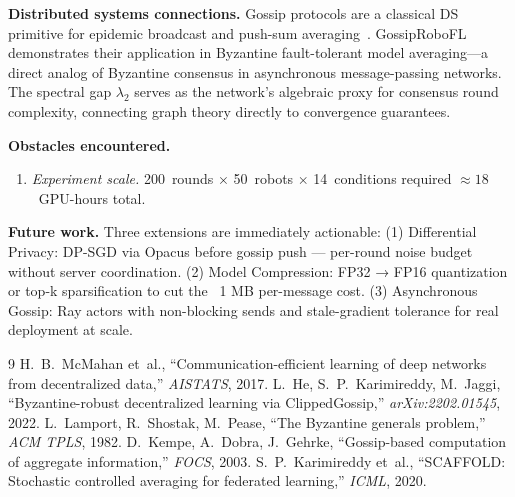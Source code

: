 \documentclass[conference]{IEEEtran}
\newcommand{\sys}{GossipRoboFL\xspace}
\begin{document}
\textbf{Distributed systems connections.}
Gossip protocols are a classical DS primitive for epidemic broadcast and
push-sum averaging~\cite{kempe2003}.
\sys demonstrates their application in Byzantine fault-tolerant model
averaging---a direct analog of Byzantine consensus in asynchronous
message-passing networks.
The spectral gap $\lambda_2$ serves as the network's algebraic proxy for
consensus round complexity, connecting graph theory directly to convergence
guarantees.

\textbf{Obstacles encountered.}
\begin{enumerate}
\item \textit{Experiment scale.}
200~rounds $\times$ 50~robots $\times$ 14~conditions required
${\approx}18$~GPU-hours total.
\end{enumerate}

\textbf{Future work.}
Three extensions are immediately actionable:
(1) Differential Privacy: DP-SGD via Opacus before gossip push — per-round noise budget without server coordination.
(2) Model Compression: FP32 → FP16 quantization or top-k sparsification to cut the ~1 MB per-message cost.
(3) Asynchronous Gossip: Ray actors with non-blocking sends and stale-gradient tolerance for real deployment at scale.

\begin{thebibliography}{9}
H.~B.\ McMahan et~al., ``Communication-efficient learning of deep networks
from decentralized data,'' \textit{AISTATS}, 2017.
L.~He, S.~P.\ Karimireddy, M.~Jaggi, ``Byzantine-robust decentralized
learning via ClippedGossip,'' \textit{arXiv:2202.01545}, 2022.
L.~Lamport, R.~Shostak, M.~Pease, ``The Byzantine generals problem,''
\textit{ACM TPLS}, 1982.
D.~Kempe, A.~Dobra, J.~Gehrke, ``Gossip-based computation of aggregate
information,'' \textit{FOCS}, 2003.
S.~P.\ Karimireddy et~al., ``SCAFFOLD: Stochastic controlled averaging for
federated learning,'' \textit{ICML}, 2020.
\end{thebibliography}
\end{document}
